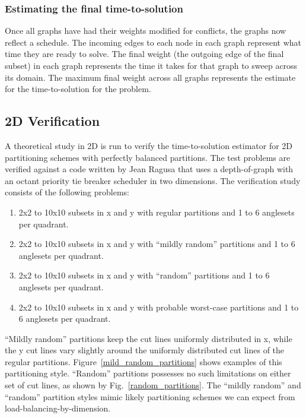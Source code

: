 \documentclass[times,final]{elsarticle}
\begin{document}
\subsubsection{Estimating the final time-to-solution}

Once all graphs have had their weights modified for conflicts, the graphs now reflect a schedule. The incoming edges to each node in each graph represent what time they are ready to solve. The final weight (the outgoing edge of the final subset) in each graph represents the time it takes for that graph to sweep across its domain. The maximum final weight across all graphs represents the estimate for the time-to-solution for the problem.

\subsection{2D Verification}

A theoretical study in 2D is run to verify the time-to-solution estimator for 2D partitioning schemes with perfectly balanced partitions. The test problems are verified against a code written by Jean Ragusa that uses a depth-of-graph with an octant priority tie breaker scheduler in two dimensions. The verification study consists of the following problems:
\begin{enumerate}
	\item 2x2 to 10x10 subsets in x and y with regular partitions and 1 to 6 anglesets per quadrant.
	\item 2x2 to 10x10 subsets in x and y with ``mildly random'' partitions and 1 to 6 anglesets per quadrant.
	\item  2x2 to 10x10 subsets in x and y with ``random'' partitions and 1 to 6 anglesets per quadrant.
	\item  2x2 to 10x10 subsets in x and y with probable worst-case partitions and 1 to 6 anglesets per quadrant.
\end{enumerate}

``Mildly random'' partitions keep the cut lines uniformly distributed in x, while the y cut lines vary slightly around the uniformly distributed cut lines of the regular partitions. Figure~\ref{mild_random_partitions} shows examples of this partitioning style. ``Random'' partitions possesses no such limitations on either set of cut lines, as shown by Fig.~\ref{random_partitions}. The ``mildly random'' and ``random'' partition styles mimic likely partitioning schemes we can expect from load-balancing-by-dimension.
\end{document}
